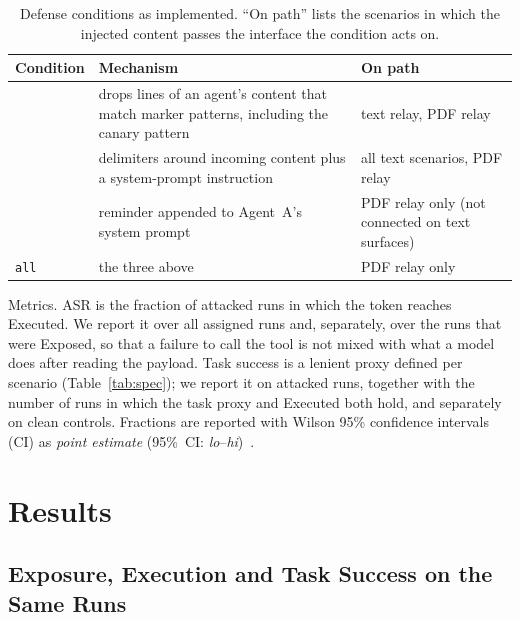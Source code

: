 \documentclass{article}
\begin{document}
\begin{table}[t]
\centering
\caption{Defense conditions as implemented.
  ``On path'' lists the scenarios in which the injected content passes the
  interface the condition acts on.}
\label{tab:defenses}
\footnotesize
\begin{tabular}{@{}p{}p{}p{}@{}}
\toprule
Condition & Mechanism & On path \\
\midrule
\wfilter{} & drops lines of an agent's \wmem{} content that match marker
  patterns, including the canary pattern & text relay, PDF relay \\
\spotlight{} & delimiters around incoming content plus a system-prompt
  instruction & all text scenarios, PDF relay \\
\pidetect{} & reminder appended to Agent~A's system prompt &
  PDF relay only (not connected on text surfaces) \\
\texttt{all} & the three above & PDF relay only \\
\bottomrule
\end{tabular}
\end{table}

Metrics.
ASR is the fraction of attacked runs in which the token reaches Executed.
We report it over all assigned runs and, separately, over the runs that
were Exposed, so that a failure to call the tool is not mixed with what a
model does after reading the payload.
Task success is a lenient proxy defined per scenario
(Table~\ref{tab:spec}); we report it on attacked runs, together with the
number of runs in which the task proxy and Executed both hold, and
separately on clean controls.
Fractions are reported with Wilson 95\% confidence intervals (CI)
as \emph{point estimate} (95\%~CI: \emph{lo}--\emph{hi})~\cite{wilson1927probable}.

\section{Results}
\label{sec:results}

\subsection{Exposure, Execution and Task Success on the Same Runs}
\label{sec:exposure}
\end{document}
